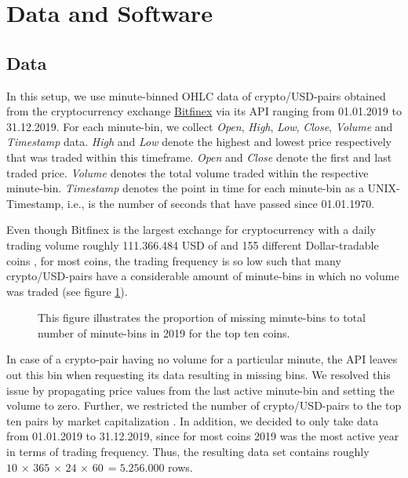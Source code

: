\section{Data and Software}

\subsection{Data}
In this setup, we use minute-binned OHLC data of crypto/USD-pairs obtained from the cryptocurrency 
exchange \href{ https://www.bitfinex.com/ }{Bitfinex} via its API ranging from 01.01.2019 to 31.12.2019.
For each minute-bin, we collect \textit{Open}, \textit{High}, \textit{Low}, \textit{Close}, \textit{Volume} 
and \textit{Timestamp} data. 
\textit{High} and \textit{Low} denote the highest and lowest price respectively
that was traded within this timeframe. 
\textit{Open} and \textit{Close} denote the first and last traded price.
\textit{Volume} denotes the total volume traded within the respective minute-bin.
\textit{Timestamp} denotes the point in time for each minute-bin as a UNIX-Timestamp,
i.e., is the number of seconds that have passed since 01.01.1970.

Even though Bitfinex is the largest exchange for cryptocurrency 
with a daily trading volume roughly 111.366.484 USD of and
155 different Dollar-tradable coins \cite{bitfinex2012},
for most coins, the trading frequency is so low such that 
many crypto/USD-pairs have a considerable amount of minute-bins in 
which no volume was traded (see figure \ref{fig:all_missing_bins_total}).

\begin{figure}[H] 
    \captionsetup{format=plain}
    \caption{
        This figure illustrates the proportion of missing minute-bins
        to total number of minute-bins in 2019 for the top ten coins.
    }
    \label{fig:all_missing_bins_total}
\end{figure}


In case of a crypto-pair having no volume for a particular minute, the API leaves out this bin
when requesting its data resulting in missing bins. 
We resolved this issue by propagating price values from the last active minute-bin
and setting the volume to zero. Further, we restricted the number of crypto/USD-pairs to the
top ten pairs by market capitalization \cite{coinmarketcap2013}. 
In addition, we decided to only take data from 01.01.2019 to 31.12.2019, 
since for most coins 2019 was the most active year in terms of trading frequency.
Thus, the resulting data set contains roughly
$ 10\, \times\, 365\, \times\, 24\, \times\, 60\, = 5.256.000 $ rows.

